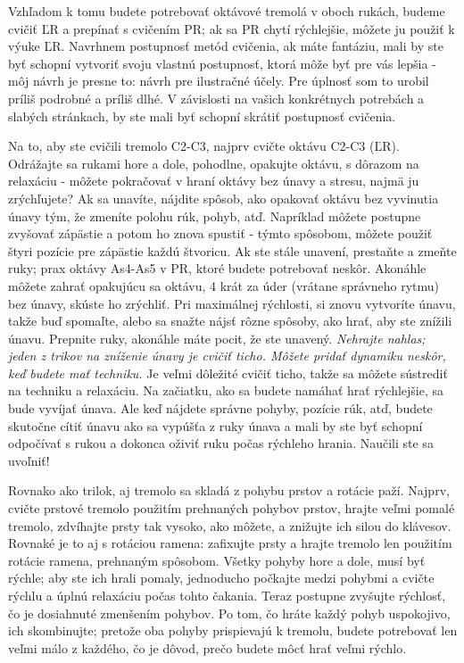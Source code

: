Vzhľadom k tomu budete potrebovať oktávové tremolá v oboch rukách, budeme cvičiť ĽR a prepínať s cvičením PR; ak sa PR chytí rýchlejšie, môžete ju použiť k výuke ĽR. Navrhnem postupnosť metód cvičenia, ak máte fantáziu, mali by ste byť schopní vytvoriť svoju vlastnú postupnosť, ktorá môže byť pre vás lepšia - môj návrh je presne to: návrh pre ilustračné účely. Pre úplnosť som to urobil príliš podrobné a príliš dlhé. V závislosti na vašich konkrétnych potrebách a slabých stránkach, by ste mali byť schopní skrátiť postupnosť cvičenia.

Na to, aby ste cvičili tremolo C2-C3, najprv cvičte oktávu C2-C3 (ĽR). Odrážajte sa rukami hore a dole, pohodlne, opakujte oktávu, s dôrazom na relaxáciu - môžete pokračovať v hraní oktávy bez únavy a stresu, najmä ju zrýchľujete? Ak sa unavíte, nájdite spôsob, ako opakovať oktávu bez vyvinutia únavy tým, že zmeníte polohu rúk, pohyb, atď. Napríklad môžete postupne zvyšovať zápästie a potom ho znova spustiť - týmto spôsobom, môžete použiť štyri pozície pre zápästie každú štvoricu. Ak ste stále unavení, prestaňte a zmeňte ruky; prax oktávy As4-As5 v PR, ktoré budete potrebovať neskôr. Akonáhle môžete zahrať opakujúcu sa oktávu, 4 krát za úder (vrátane správneho rytmu) bez únavy, skúste ho zrýchliť. Pri maximálnej rýchlosti, si znovu vytvoríte únavu, takže buď spomaľte, alebo sa snažte nájsť rôzne spôsoby, ako hrať, aby ste znížili únavu. Prepnite ruky, akonáhle máte pocit, že ste unavený. \emph{Nehrajte nahlas; jeden z trikov na zníženie únavy je cvičiť ticho. Môžete pridať dynamiku neskôr, keď budete mať techniku.} Je veľmi dôležité cvičiť ticho, takže sa môžete sústrediť na techniku a relaxáciu. Na začiatku, ako sa budete namáhať hrať rýchlejšie, sa bude vyvíjať únava. Ale keď nájdete správne pohyby, pozície rúk, atď, budete skutočne cítiť únavu ako sa vypúšťa z ruky únava a mali by ste byť schopní odpočívať s rukou a dokonca oživiť ruku počas rýchleho hrania. Naučili ste sa uvoľniť! 

Rovnako ako trilok, aj tremolo sa skladá z pohybu prstov a rotácie paží. Najprv, cvičte prstové tremolo použitím prehnaných pohybov prstov, hrajte veľmi pomalé tremolo, zdvíhajte prsty tak vysoko, ako môžete, a znižujte ich silou do klávesov. Rovnaké je to aj s rotáciou ramena: zafixujte prsty a hrajte tremolo len použitím rotácie ramena, prehnaným spôsobom. Všetky pohyby hore a dole, musí byť rýchle; aby ste ich hrali pomaly, jednoducho počkajte medzi pohybmi a cvičte rýchlu a úplnú relaxáciu počas tohto čakania. Teraz postupne zvyšujte rýchlosť, čo je dosiahnuté zmenšením pohybov. Po tom, čo hráte každý pohyb uspokojivo, ich skombinujte; pretože oba pohyby prispievajú k tremolu, budete potrebovať len veľmi málo z každého, čo je dôvod, prečo budete môcť hrať veľmi rýchlo.

